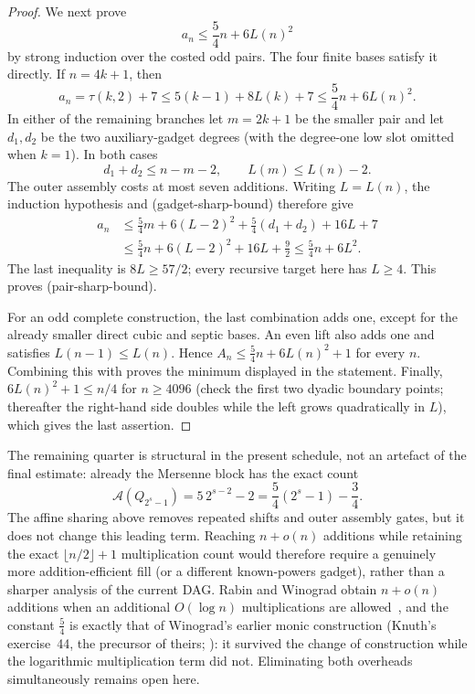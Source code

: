 \begin{proof}
We next prove
\[
  a_n\le\frac54n+6L(n)^2
  \tag{pair-sharp-bound}
\]
by strong induction over the costed odd pairs.  The four finite bases satisfy
it directly.  If $n=4k+1$, then
\[
 a_n=\tau(k,2)+7
   \le5(k-1)+8L(k)+7
   \le\frac54n+6L(n)^2.
\]
In either of the remaining branches let $m=2k+1$ be the smaller pair and
let $d_1,d_2$ be the two auxiliary-gadget degrees (with the degree-one low
slot omitted when $k=1$).  In both cases
\[
 d_1+d_2\le n-m-2,
 \qquad L(m)\le L(n)-2.
\]
The outer assembly costs at most seven additions.  Writing $L=L(n)$, the
induction hypothesis and (gadget-sharp-bound) therefore give
\[
 \begin{aligned}
  a_n
  &\le \frac54m+6(L-2)^2
       +\frac54(d_1+d_2)+16L+7\\
  &\le \frac54n+6(L-2)^2+16L+\frac92
   \le \frac54n+6L^2.
 \end{aligned}
\]
The last inequality is $8L\ge57/2$; every recursive target here has
$L\ge4$.  This proves (pair-sharp-bound).

For an odd complete construction, the last combination adds one, except
for the already smaller direct cubic and septic bases.  An even lift also
adds one and satisfies $L(n-1)\le L(n)$.  Hence
$A_n\le\frac54n+6L(n)^2+1$ for every $n$.  Combining this with
 proves the minimum displayed in the
statement.  Finally,
$6L(n)^2+1\le n/4$ for $n\ge4096$ (check the first two dyadic boundary
points; thereafter the right-hand side doubles while the left grows
quadratically in $L$), which gives the last assertion.
\end{proof}

\begin{remark}
The remaining quarter is structural in the present schedule, not an artefact
of the final estimate: already the Mersenne block has the exact count
\[
 \mathcal A(Q_{2^s-1})=5\,2^{s-2}-2
   =\frac54(2^s-1)-\frac34.
\]
The affine sharing above removes repeated shifts and outer assembly gates,
but it does not change this leading term.  Reaching $n+o(n)$ additions while
retaining the exact $\lfloor n/2\rfloor+1$ multiplication count would
therefore require a genuinely more addition-efficient fill (or a different
known-powers gadget), rather than a sharper analysis of the current DAG.
Rabin and Winograd obtain $n+o(n)$ additions when an additional
$O(\log n)$ multiplications are allowed~\cite{rabin1972number}, and the
constant $\frac54$ is exactly that of Winograd's earlier monic
construction (Knuth's exercise~44, the precursor of theirs;
): it survived the change of construction while the
logarithmic multiplication term did not.
Eliminating both overheads simultaneously remains open here.
\end{remark}

